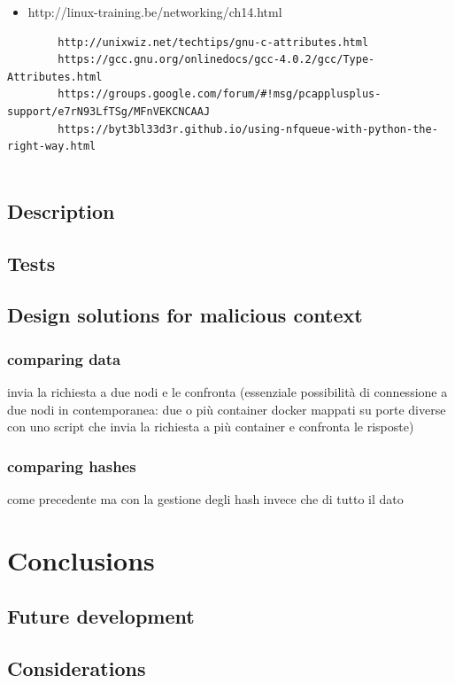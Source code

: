 \documentclass[12pt]{article}
\begin{document}
	
	\begin{itemize}
		\item http://linux-training.be/networking/ch14.html
	\end{itemize}

	\begin{verbatim}
		http://unixwiz.net/techtips/gnu-c-attributes.html
		https://gcc.gnu.org/onlinedocs/gcc-4.0.2/gcc/Type-Attributes.html
		https://groups.google.com/forum/#!msg/pcapplusplus-support/e7rN93LfTSg/MFnVEKCNCAAJ
		https://byt3bl33d3r.github.io/using-nfqueue-with-python-the-right-way.html
		
	\end{verbatim}
			
	\subsection{Description}
	\subsection{Tests}
	\subsection{Design solutions for malicious context}
		\subsubsection{comparing data}
		invia la richiesta a due nodi e le confronta (essenziale possibilità di connessione a due nodi in contemporanea: due o più container docker mappati su porte diverse con uno script che invia la richiesta a più container e confronta le risposte)

		\subsubsection{comparing hashes}
		come precedente ma con la gestione degli hash invece che di tutto il dato
		
\section{Conclusions}
	\subsection{Future development}
	\subsection{Considerations}
\end{document}
